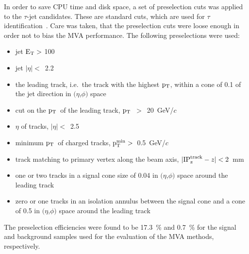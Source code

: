 \documentclass[a4paper]{jpconf}
\newcommand{\pT}{\mbox{${\rm p}_{\rm T}$}}
\begin{document}
In order to save CPU time and disk space, a set of preselection cuts
was applied to the $\tau$-jet candidates. These are standard cuts,
which are used for $\tau$ identification~\cite{tautagging}. Care was
taken, that the preselection cuts were loose enough in order not to
bias the MVA performance. The following preselections were used:
\begin{itemize}
\item jet ${\rm E}_{\rm T} >$ 100 
\item jet $|\eta|<$~2.2 
\item the leading track, i.e.~the track with the highest \pT, within a
  cone of 0.1 of the jet direction in $(\eta$,$\phi)$ space
\item cut on the \pT\ of the leading track, \pT~$>$~20~GeV/$c$
\item $\eta$ of tracks, $|\eta|<$~2.5
\item minimum \pT\ of charged tracks,
  ${\rm p}_{\rm T}^{\rm min} >$~0.5~GeV/$c$
\item track matching to primary vertex along the beam axis, $|{\rm
  IP}_{\rm z}^{\rm track}-z|<2$~mm
\item one or two tracks in a signal cone size of 0.04 in $(\eta$,$\phi)$
  space around the leading track
\item zero or one tracks in an isolation annulus between the signal
  cone and a cone of 0.5 in $(\eta$,$\phi)$ space around the leading track 
\end{itemize} 
The preselection efficiencies were found to be 17.3~\% and 0.7~\% for the
signal and background samples used for the evaluation of the MVA
methods, respectively.
\end{document}
